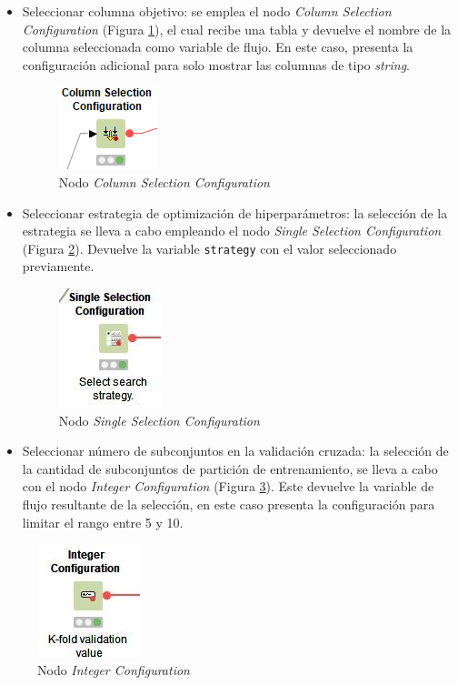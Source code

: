 \begin{itemize}
	\item Seleccionar columna objetivo: se emplea el nodo \textit{Column Selection Configuration} (Figura \ref{fig:nodo-column-select-conf}), el cual recibe una tabla y devuelve el nombre de la columna seleccionada como variable de flujo. En este caso, presenta la configuración adicional para solo mostrar las columnas de tipo \textit{string}.
	\begin{figure}[H]
		\centering
		\includegraphics[width=0.15\linewidth]{"figuras/capi 2/nodo-column-select-conf"}
		\caption[Nodo Column Selection Configuration]{Nodo \textit{Column Selection Configuration}}
		\label{fig:nodo-column-select-conf}
	\end{figure}
	
	\item Seleccionar estrategia de optimización de hiperparámetros: la selección de la estrategia se lleva a cabo empleando el nodo \textit{Single Selection Configuration} (Figura \ref{fig:nodo-single-select-conf}). Devuelve la variable \texttt{strategy} con el valor seleccionado previamente.
	\begin{figure}[H]
		\centering
		\includegraphics[width=0.15\linewidth]{"figuras/capi 2/nodo-single-select-conf"}
		\caption[Nodo Single Selection Configuration]{Nodo \textit{Single Selection Configuration}}
		\label{fig:nodo-single-select-conf}
	\end{figure}
	
	\item Seleccionar número de subconjuntos en la validación cruzada: la selección de la cantidad de subconjuntos de partición de entrenamiento, se lleva a cabo con el nodo \textit{Integer Configuration} (Figura \ref{fig:nodo-int-conf}). Este devuelve la variable de flujo resultante de la selección, en este caso presenta la configuración para limitar el rango entre 5 y 10.
\end{itemize}
\begin{figure}[H]
	\centering
	\includegraphics[width=0.15\linewidth]{"figuras/capi 2/nodo-int-conf"}
	\caption[Nodo Integer Configuration]{Nodo \textit{Integer Configuration}}
	\label{fig:nodo-int-conf}
\end{figure}

